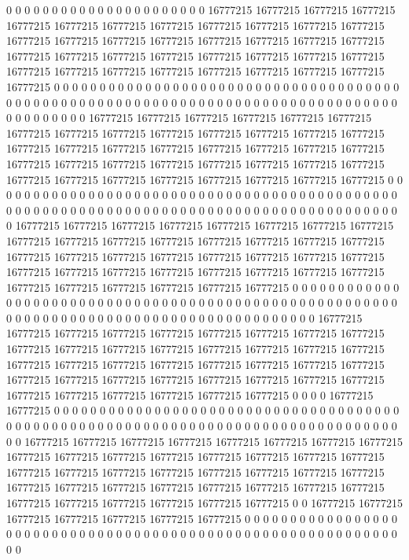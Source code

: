 0 0 0 0 0 0 0 0 0 0 0 0 0 0 0 0 0 0 0 0 0 0 16777215 16777215 16777215 16777215 16777215 16777215 16777215 16777215 16777215 16777215 16777215 16777215 16777215 16777215 16777215 16777215 16777215 16777215 16777215 16777215 16777215 16777215 16777215 16777215 16777215 16777215 16777215 16777215 16777215 16777215 16777215 16777215 16777215 16777215 16777215 16777215 16777215 0 0 0 0 0 0 0 0 0 0 0 0 0 0 0 0 0 0 0 0 0 0 0 0 0 0 0 0 0 0 0 0 0 0 0 0 0 0 0 0 0 0 0 0 0 0 0 0 0 0 0 0 0 0 0 0 0 0 0 0 0 0 0 0 0 0 0 0 0
0 0 0 0 0 0 0 0 0 0 0 0 0 0 0 0 0 0 0 0 0 16777215 16777215 16777215 16777215 16777215 16777215 16777215 16777215 16777215 16777215 16777215 16777215 16777215 16777215 16777215 16777215 16777215 16777215 16777215 16777215 16777215 16777215 16777215 16777215 16777215 16777215 16777215 16777215 16777215 16777215 16777215 16777215 16777215 16777215 16777215 16777215 16777215 16777215 0 0 0 0 0 0 0 0 0 0 0 0 0 0 0 0 0 0 0 0 0 0 0 0 0 0 0 0 0 0 0 0 0 0 0 0 0 0 0 0 0 0 0 0 0 0 0 0 0 0 0 0 0 0 0 0 0 0 0 0 0 0 0 0 0 0 0 0 0
0 0 0 0 0 0 0 0 0 0 0 0 0 0 0 0 0 0 0 0 16777215 16777215 16777215 16777215 16777215 16777215 16777215 16777215 16777215 16777215 16777215 16777215 16777215 16777215 16777215 16777215 16777215 16777215 16777215 16777215 16777215 16777215 16777215 16777215 16777215 16777215 16777215 16777215 16777215 16777215 16777215 16777215 16777215 16777215 16777215 16777215 16777215 16777215 0 0 0 0 0 0 0 0 0 0 0 0 0 0 0 0 0 0 0 0 0 0 0 0 0 0 0 0 0 0 0 0 0 0 0 0 0 0 0 0 0 0 0 0 0 0 0 0 0 0 0 0 0 0 0 0 0 0 0 0 0 0 0 0 0 0 0 0 0 0
0 0 0 0 0 0 0 0 0 0 0 0 0 0 0 0 0 0 0 16777215 16777215 16777215 16777215 16777215 16777215 16777215 16777215 16777215 16777215 16777215 16777215 16777215 16777215 16777215 16777215 16777215 16777215 16777215 16777215 16777215 16777215 16777215 16777215 16777215 16777215 16777215 16777215 16777215 16777215 16777215 16777215 16777215 16777215 16777215 16777215 16777215 16777215 16777215 0 0 0 0 16777215 16777215 0 0 0 0 0 0 0 0 0 0 0 0 0 0 0 0 0 0 0 0 0 0 0 0 0 0 0 0 0 0 0 0 0 0 0 0 0 0 0 0 0 0 0 0 0 0 0 0 0 0 0 0 0 0 0 0 0 0 0 0 0 0 0 0
0 0 0 0 0 0 0 0 0 0 0 0 0 0 0 0 0 0 0 16777215 16777215 16777215 16777215 16777215 16777215 16777215 16777215 16777215 16777215 16777215 16777215 16777215 16777215 16777215 16777215 16777215 16777215 16777215 16777215 16777215 16777215 16777215 16777215 16777215 16777215 16777215 16777215 16777215 16777215 16777215 16777215 16777215 16777215 16777215 16777215 16777215 16777215 0 0 16777215 16777215 16777215 16777215 16777215 16777215 16777215 0 0 0 0 0 0 0 0 0 0 0 0 0 0 0 0 0 0 0 0 0 0 0 0 0 0 0 0 0 0 0 0 0 0 0 0 0 0 0 0 0 0 0 0 0 0 0 0 0 0 0 0 0 0 0 0 0 0 0 0 0 0
